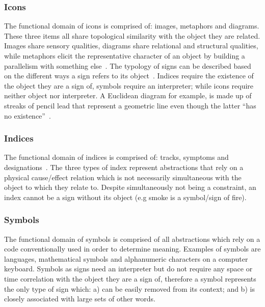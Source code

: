 \subsubsection{Icons} The functional domain of icons is comprised of: images, metaphors and diagrams. These three items all share topological similarity with the object they are related. Images share sensory qualities, 
diagrams share relational and structural qualities, while metaphors elicit the representative character of an object by building a parallelism with something else~\cite{Johansen2002}. The typology of signs can be described based on the different ways a sign refers to its object~\cite{Peirce1955}.
Indices require the existence of the object they are a sign of, symbols require an interpreter; while icons require neither object nor interpreter.
A Euclidean diagram for example, is made up of streaks of pencil lead that represent a geometric line even though the latter ``has no existence''~\cite{Peirce1902}.


\subsubsection{Indices} The functional domain of indices is comprised of: tracks, symptoms and designations~\cite{Johansen2002}. The three types of index represent abstractions that rely on a physical cause/effect relation which is not necessarily simultaneous with the object to which they relate to. Despite simultaneously not being a constraint, an index cannot be a sign without its object (e.g smoke is a symbol/sign of fire).

\subsubsection{Symbols} The functional domain of symbols is comprised of  all abstractions which rely on a code conventionally used in order to determine meaning. Examples of symbols are languages, mathematical symbols and alphanumeric characters on a computer keyboard. Symbols as signs need an interpreter but do not require any space or time correlation with the object they are a sign of, therefore a symbol represents the only type of sign which: a) can be easily removed from its context; and b) is closely associated with large sets of other words. 




